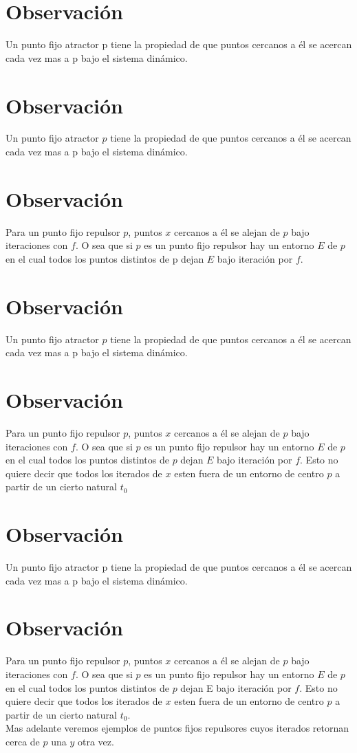 \documentclass[11pt]{beamer}
\begin{document}
\section*{Observación}
Un punto fijo atractor p tiene la propiedad de que puntos cercanos a él se acercan cada vez mas a p bajo el sistema dinámico.

\section*{Observación}
Un punto fijo atractor $p$ tiene la propiedad de que puntos cercanos a él se acercan cada vez mas a p bajo el sistema dinámico.

\section*{Observación}
Para un punto fijo repulsor $p$, puntos $x$ cercanos a él se alejan de $p$ bajo iteraciones con $f$. O sea que si $p$ es un punto fijo repulsor hay un entorno $E$ de $p$ en el cual todos los puntos distintos de p dejan $E$ bajo iteración por $f$.

\section*{Observación}
Un punto fijo atractor $p$ tiene la propiedad de que puntos cercanos a él se acercan cada vez mas a p bajo el sistema dinámico.

\section*{Observación}
Para un punto fijo repulsor $p$, puntos $x$ cercanos a él se alejan de $p$ bajo iteraciones con $f$. O sea que si $p$ es un punto fijo repulsor hay un entorno $E$ de $p$ en el cual todos los puntos distintos de $p$ dejan $E$ bajo iteración por $f$. Esto no quiere decir que todos los iterados de $x$ esten fuera de un entorno de centro $p$ a partir de un cierto natural $t_{0}$

\section*{Observación}
Un punto fijo atractor p tiene la propiedad de que puntos cercanos a él se acercan cada vez mas a p bajo el sistema dinámico.

\section*{Observación}
Para un punto fijo repulsor $p$, puntos $x$ cercanos a él se alejan de $p$ bajo iteraciones con $f$. O sea que si $p$ es un punto fijo repulsor hay un entorno $E$ de $p$ en el cual todos los puntos distintos de $p$ dejan E bajo iteración por $f$. Esto no quiere decir que todos los iterados de $x$ esten fuera de un entorno de centro $p$ a partir de un cierto natural $t_{0}$.\\
Mas adelante veremos ejemplos de puntos fijos repulsores cuyos iterados retornan cerca de $p$ una $y$ otra vez.
\end{document}
